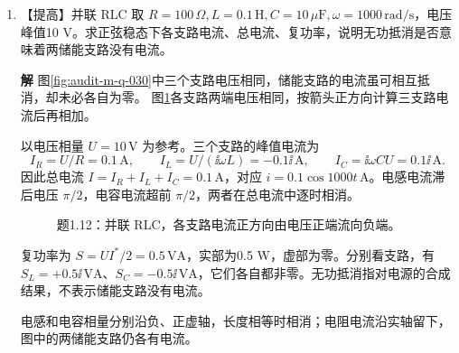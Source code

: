\documentclass[11pt,openany,fontset=fandol]{ctexbook}
\theoremstyle{plain}\newtheorem{theorem}{定理}[chapter]\newtheorem{proposition}[theorem]{命题}
\theoremstyle{definition}\newtheorem{definition}{定义}[chapter]\newtheorem{example}{例}[chapter]
\theoremstyle{remark}\newtheorem*{remark}{说明}
\newcommand{\SolutionStart}{\par\nobreak\medskip\nobreak\noindent\textbf{解}\quad\ignorespaces}
\newenvironment{solution}{\SolutionStart}{\par\medskip}
\begin{document}
\begin{enumerate}[label=1.\arabic*]
\begin{solution}
纵向峰比只由指数衰减产生；因此用同一图读出的峰间距与峰比，可以分别求阻尼频率和衰减率。
\end{solution}

\item \begin{minipage}[t]{\linewidth}
【提高】并联 RLC 取 $R=100\,\Omega,L=0.1\,\mathrm H,C=10\,\mu\mathrm F,\omega=1000\,\mathrm{rad/s}$，电压峰值10 V。求正弦稳态下各支路电流、总电流、复功率，说明无功抵消是否意味着两储能支路没有电流。

\end{minipage}

\begin{solution}
图\ref{fig:audit-m-q-030}中三个支路电压相同，储能支路的电流虽可相互抵消，却未必各自为零。
图\ref{fig:ex-1-12}各支路两端电压相同，按箭头正方向计算三支路电流后再相加。

以电压相量 $U=10\,\mathrm V$ 为参考。三个支路的峰值电流为
\[
I_R=U/R=0.1\,\mathrm A,
\qquad I_L=U/(\ii\omega L)=-0.1\ii\,\mathrm A,
\qquad I_C=\ii\omega CU=0.1\ii\,\mathrm A.
\]
因此总电流 $I=I_R+I_L+I_C=0.1\,\mathrm A$，对应 $i=0.1\cos1000t\,\mathrm A$。电感电流滞后电压 $\pi/2$，电容电流超前 $\pi/2$，两者在总电流中逐时相消。

\begin{figure}[H]\centering
{}
\caption{题1.12：并联 RLC，各支路电流正方向由电压正端流向负端。}\label{fig:ex-1-12}
\end{figure}

复功率为 $S=UI^*/2=0.5\,\mathrm{VA}$，实部为0.5 W，虚部为零。分别看支路，有 $S_L=+0.5\ii\,\mathrm{VA}$、$S_C=-0.5\ii\,\mathrm{VA}$，它们各自都非零。无功抵消指对电源的合成结果，不表示储能支路没有电流。

电感和电容相量分别沿负、正虚轴，长度相等时相消；电阻电流沿实轴留下，图中的两储能支路仍各有电流。
\end{solution}


\end{enumerate}
\end{document}
